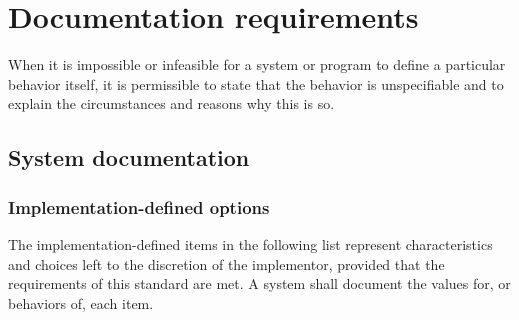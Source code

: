 
\chapter{Documentation requirements}
\label{doc}

When it is impossible or infeasible for a system or program to
define a particular behavior itself, it is permissible to state
that the behavior is unspecifiable and to explain the circumstances
and reasons why this is so.

\section{System documentation} %
\label{doc:system}

\subsection{Implementation-defined options} %
\label{doc:imp}

The implementation-defined items in the following list represent
characteristics and choices left to the discretion of the
implementor, provided that the requirements of this standard are
met. A system shall document the values for, or behaviors of, each
item.

